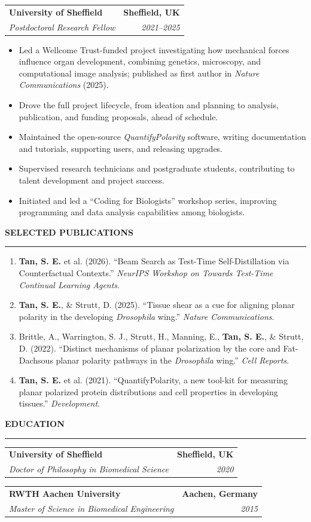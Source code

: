 \documentclass[10pt,a4paper]{article}
\makeatletter
\newcommand{\cvsection}[1]{%
  \vspace{0.8em}%
  {\large\bfseries\color{heading}#1}\par
  \vspace{-0.35em}%
  {\color{heading}\rule{\textwidth}{0.6pt}}\par
  \vspace{0.1em}%
}
\newcommand{\entry}[4]{%
  \begin{tabularx}{\textwidth}{@{}Xr@{}}
    \textbf{#1} & \textbf{#2} \\
    \textit{#3} & \textit{#4}
  \end{tabularx}
}
\makeatother
\begin{document}
\entry{University of Sheffield}{Sheffield, UK}{Postdoctoral Research Fellow}{2021--2025}
\begin{itemize}
  \item Led a Wellcome Trust-funded project investigating how mechanical forces influence organ development, combining genetics, microscopy, and computational image analysis; published as first author in \textit{Nature Communications} (2025).
  \item Drove the full project lifecycle, from ideation and planning to analysis, publication, and funding proposals, ahead of schedule.
  \item Maintained the open-source \textit{QuantifyPolarity} software, writing documentation and tutorials, supporting users, and releasing upgrades.
  \item Supervised research technicians and postgraduate students, contributing to talent development and project success.
  \item Initiated and led a ``Coding for Biologists'' workshop series, improving programming and data analysis capabilities among biologists.
\end{itemize}

\cvsection{SELECTED PUBLICATIONS}

\begin{enumerate}[leftmargin=1.6em, itemsep=0.25em, topsep=0.25em]
  \item \textbf{Tan, S. E.} et al. (2026). ``Beam Search as Test-Time Self-Distillation via Counterfactual Contexts.'' \textit{NeurIPS Workshop on Towards Test-Time Continual Learning Agents}.
  \item \textbf{Tan, S. E.}, \& Strutt, D. (2025). ``Tissue shear as a cue for aligning planar polarity in the developing \textit{Drosophila} wing.'' \textit{Nature Communications}.
  \item Brittle, A., Warrington, S. J., Strutt, H., Manning, E., \textbf{Tan, S. E.}, \& Strutt, D. (2022). ``Distinct mechanisms of planar polarization by the core and Fat-Dachsous planar polarity pathways in the \textit{Drosophila} wing.'' \textit{Cell Reports}.
  \item \textbf{Tan, S. E.} et al. (2021). ``QuantifyPolarity, a new tool-kit for measuring planar polarized protein distributions and cell properties in developing tissues.'' \textit{Development}.
\end{enumerate}

\cvsection{EDUCATION}

\entry{University of Sheffield}{Sheffield, UK}{Doctor of Philosophy in Biomedical Science}{2020}
\entry{RWTH Aachen University}{Aachen, Germany}{Master of Science in Biomedical Engineering}{2015}
\end{document}
